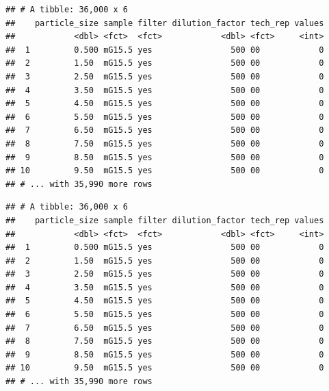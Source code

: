 \documentclass[10pt,letterpaper]{article}
\newenvironment{Shaded}{\begin{snugshade}}{\end{snugshade}}
\newcommand{\KeywordTok}[1]{\textcolor[rgb]{0.13,0.29,0.53}{\textbf{#1}}}
\newcommand{\DataTypeTok}[1]{\textcolor[rgb]{0.13,0.29,0.53}{#1}}
\newcommand{\DecValTok}[1]{\textcolor[rgb]{0.00,0.00,0.81}{#1}}
\newcommand{\StringTok}[1]{\textcolor[rgb]{0.31,0.60,0.02}{#1}}
\newcommand{\OperatorTok}[1]{\textcolor[rgb]{0.81,0.36,0.00}{\textbf{#1}}}
\newcommand{\NormalTok}[1]{#1}
\begin{document}
\begin{verbatim}
## # A tibble: 36,000 x 6
##    particle_size sample filter dilution_factor tech_rep values
##            <dbl> <fct>  <fct>            <dbl> <fct>     <int>
##  1         0.500 mG15.5 yes                500 00            0
##  2         1.50  mG15.5 yes                500 00            0
##  3         2.50  mG15.5 yes                500 00            0
##  4         3.50  mG15.5 yes                500 00            0
##  5         4.50  mG15.5 yes                500 00            0
##  6         5.50  mG15.5 yes                500 00            0
##  7         6.50  mG15.5 yes                500 00            0
##  8         7.50  mG15.5 yes                500 00            0
##  9         8.50  mG15.5 yes                500 00            0
## 10         9.50  mG15.5 yes                500 00            0
## # ... with 35,990 more rows
\end{verbatim}

\begin{Shaded}
\end{Shaded}

\begin{verbatim}
## # A tibble: 36,000 x 6
##    particle_size sample filter dilution_factor tech_rep values
##            <dbl> <fct>  <fct>            <dbl> <fct>     <int>
##  1         0.500 mG15.5 yes                500 00            0
##  2         1.50  mG15.5 yes                500 00            0
##  3         2.50  mG15.5 yes                500 00            0
##  4         3.50  mG15.5 yes                500 00            0
##  5         4.50  mG15.5 yes                500 00            0
##  6         5.50  mG15.5 yes                500 00            0
##  7         6.50  mG15.5 yes                500 00            0
##  8         7.50  mG15.5 yes                500 00            0
##  9         8.50  mG15.5 yes                500 00            0
## 10         9.50  mG15.5 yes                500 00            0
## # ... with 35,990 more rows
\end{verbatim}
\end{document}
